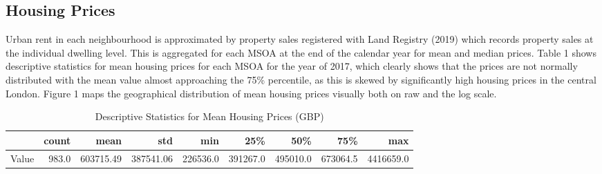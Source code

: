 \documentclass{article}
\begin{document}
\subsection{Housing Prices}
Urban rent in each neighbourhood is approximated by property sales registered with Land Registry (2019) which records property sales at the individual dwelling level. This is aggregated for each MSOA at the end of the calendar year for mean and median prices. Table 1 shows descriptive statistics for mean housing prices for each MSOA for the year of 2017, which clearly shows that the prices are not normally distributed with the mean value almost approaching the 75\% percentile, as this is skewed by significantly high housing prices in the central London. Figure 1 maps the geographical distribution of mean housing prices visually both on raw and the log scale.


\begin{table}[H]
\caption{Descriptive Statistics for Mean Housing Prices (GBP)} 
  \label{} 
\begin{tabular}{lrrrrrrrr}
\toprule
{} &  count &       mean &        std &       min &       25\% &       50\% &       75\% &        max \\
\midrule
Value &  983.0 &  603715.49 &  387541.06 &  226536.0 &  391267.0 &  495010.0 &  673064.5 &  4416659.0 \\
\bottomrule
\end{tabular}
\end{table}
\end{document}
